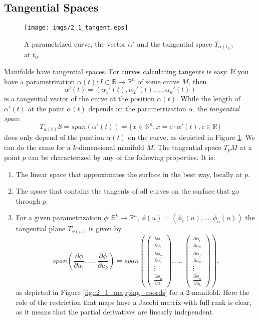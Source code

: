 	
\subsection{Tangential Spaces}		
\begin{figure}[tb]
\begin{center}
\texttt{[image: imgs/2\_1\_tangent.eps]}
\end{center}
\caption{A parametrized curve, the vector $\alpha'$ and the tangential space $T_{\alpha(t_0)}$ at $t_0$.}
\label{fig::2_1_paramCurve}
\end{figure}


Manifolds have tangential spaces.
For curves calculating tangents is easy. If you have a parametrization $\alpha(t): I \subset \mathbb R \to \mathbb R^n$ of some curve $M$, then $$\alpha'(t) = (\alpha_1'(t),\alpha_2'(t),...,\alpha_n'(t))$$ is a tangential vector of the curve at the position $\alpha(t)$. 		While the length of $\alpha'(t)$ at the point $\alpha(t)$ depends on the parametrization $\alpha$,  the \emph{tangential space} $$ T_{\alpha(t)}S = span(\alpha'(t)) = \{x \in \mathbb R^n: x = c \cdot\alpha'(t), c \in \mathbb R\}$$ does only depend of the position $\alpha(t)$ on the curve, as depicted in Figure \ref{fig::2_1_paramCurve}. 
We can do the same for a $k$-dimensional manifold $M$. The tangential space $T_p M$ at a point $p$ can be characterized by any of the following properties. It is:

\begin{enumerate}
	\item The linear space that approximates the surface in the best way, locally at $p$.
	\item The space that contains the tangents of all curves on the surface that go through $p$.
	\item For a given parametrization $\phi: \mathbb R^k \to \mathbb R^n$, $\phi(u) = (\phi_1(u),...,\phi_n(u))$ the tangential plane $T_{\phi(u)}$ is given by
			\[span(\frac{\partial \phi} {\partial u_1},..., \frac{\partial \phi} {\partial u_k}) = span(\begin{pmatrix}
	\frac{\partial \phi_1} {\partial u_1} \\
	\frac{\partial \phi_2} {\partial u_1}\\
	\vdots\\
	\frac{\partial \phi_n} {\partial u_1}
\end{pmatrix},...,\begin{pmatrix}
	\frac{\partial \phi_1} {\partial u_k} \\
	\frac{\partial \phi_2} {\partial u_k}\\
	\vdots\\
	\frac{\partial \phi_n} {\partial u_k}
\end{pmatrix}),\]
as depicted in Figure \ref{fig::2_1_mapping_coords} for a 2-manifold. Here the role of the restriction that maps have a Jacobi matrix with full rank is clear, as it means that the partial derivatives are linearly independent.
\end{enumerate}

